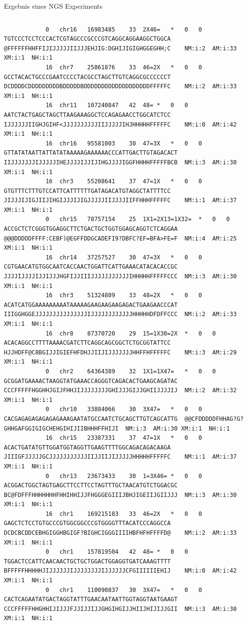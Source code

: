 \documentclass[10pt]{beamer}
\begin{document}
\begin{frame}[fragile]{Ergebnis eines NGS Experiments}
\begin{columns}
\begin{lstlisting}
			0	chr16	16983485	33	2X46=	*	0	0	TGTCCCTCCTCCCACTCGTAGCCCGCCCGTCAGGCAGGAAGGCTGGCA	@FFFFFFHHFFIJIJJJJJIIJJJEHJIG:DGHIJIGIGHGGEGHH;C	NM:i:2	AM:i:33	XM:i:1	NH:i:1
			16	chr7	25861876	33	46=2X	*	0	0	GCCTACACTGCCCGAATCCCCTACGCCTAGCTTGTCAGGCGCCCCCCT	DCDDDDCDDDDDDDDDBDDDDDBDDDDDDDDDDDDDDDDDDDFFFFFC	NM:i:2	AM:i:33	XM:i:1	NH:i:1
			16	chr11	107240847	42	48=	*	0	0	AATCTACTGAGCTAGCTTAAGAAAGGCTCCAGAGAACCTGGCATCTCC	IJJJJJJIIGHJGIHF<JJJJJJJJJJIIJJJJJIHJHHHHHFFFFFC	NM:i:0	AM:i:42	XM:i:1	NH:i:1
			16	chr16	95581003	30	47=3X	*	0	0	GTTATATAATTATTATATAAAAAGAAAAAACCCATTGACTTGTAGACACT	IIJJJJJJJIJJJJJIHEJJJJIJJIJIHGJJJJIGGFHHHHFFFFFBCB	NM:i:3	AM:i:30	XM:i:1	NH:i:1
			16	chr3	55208641	37	47=1X	*	0	0	GTGTTTCTTTGTCCATTCATTTTTTGATAGACATGTAGGCTATTTTCC	JIJJJIJIGJIIJIHGIJJJIJIGJJJJJIIJJJJIIFFHHHFFFFFC	NM:i:1	AM:i:37	XM:i:1	NH:i:1
			0	chr15	78757154	25	1X1=2X13=1X32=	*	0	0	ACCGCTCTCGGGTGGAGGCTTCTGACTGCTGGTGGAGCAGGTCTCAGGAA	@@@DDDDDFFFF:CEBF)@EGFFDDGCADEFI9?DBFC?EF=BFA>FE=F	NM:i:4	AM:i:25	XM:i:1	NH:i:1
			16	chr14	37257527	30	47=3X	*	0	0	CGTGAACATGTGGCAATCACCAACTGGATTCATTGAAACATACACACCGC	JJJJIJJJJIJJIJJJHGFIJJIIIJJJJJJJJJJJIHHHHHFFFFFCCC	NM:i:3	AM:i:30	XM:i:1	NH:i:1
			16	chr3	51324809	33	48=2X	*	0	0	ACATCATGGAAAAAAAAATAAAAAGAAGAAGAAGAGACTGAAGAACCCAT	IIIGGHGGEJJJJJJJJJJJJJJJIJJJJJJJJJJJJHHHHHDFDFFCCC	NM:i:2	AM:i:33	XM:i:1	NH:i:1
			16	chr8	87370720	29	15=1X30=2X	*	0	0	ACACAGGCCTTTTAAAACGATCTTCAGGCAGCGGCTCTGCGGTATTCC	HJJHDFF@C8BGIJJIGIEFHFDHJJIIJIJJJJJJJHHFFHFFFFFC	NM:i:3	AM:i:29	XM:i:1	NH:i:1
			0	chr2	64364389	32	1X1=1X47=	*	0	0	GCGGATGAAAACTAAGGTATGAAACCAGGGTCAGACACTGAAGCAGATAC	CCCFFFFFHGGHHJGIJFHHJIJJJJJJJJGHIJJJGIJJGHIIJJJJIJ	NM:i:2	AM:i:32	XM:i:1	NH:i:1
			0	chr10	33884066	30	3X47=	*	0	0	CACGAGAGAGAGAGAGAAAGAATATGCCAATCTGCAGCTTGTCAGCATTG	@@CFDDDDDFHHAG?G?GHHGAFGGIGIGCHEHGIHIJIIBHHHFFHIJI	NM:i:3	AM:i:30	XM:i:1	NH:i:1
			16	chr15	23387331	37	47=1X	*	0	0	ACACTGATATGTTGGATGGTAGGTTGAAGTTTTGGCAGACAGACAAGA	JIIIGFJJJJJGCJJJJJJJJJJJIIJJIIJIJJJJJHHHHHFFFFFC	NM:i:1	AM:i:37	XM:i:1	NH:i:1
			0	chr13	23673433	30	1=3X46=	*	0	0	ACGGACTGGCTAGTGAGCTTCCTTCCTAGTTTGCTAACATGTCTGGACGC	BC@FDFFFHHHHHHHFHHIHHIJJFHGGGEGIIIJBHJIGEIIJGIIJJJ	NM:i:3	AM:i:30	XM:i:1	NH:i:1
			16	chr1	169215183	33	46=2X	*	0	0	GAGCTCTCCTGTGCCCGTGGCGGCCCGTGGGGTTTACATCCCAGGCCA	DCDCBCDDCEBHGIGGHBGIGF?BIGHCIGGGIIIIHBFHFHFFFFD@	NM:i:2	AM:i:33	XM:i:1	NH:i:1
			0	chr1	157819504	42	48=	*	0	0	TGGACTCCATTCAACAACTGCTGCTGGACTGGAGGTGATCAAAGTTTT	BFFFFFHHHHHJIJJJJJJIJJJJJJJJIJJJJJJCFGIIIIIIEHIJ	NM:i:0	AM:i:42	XM:i:1	NH:i:1
			0	chr1	110090837	30	3X47=	*	0	0	CACTCAGAATATGACTAGGTATTTGAACAATAATTGGTAGGTAATGAAGT	CCCFFFFFHHGHHIJIJJJFJJIJJIJJGHGIHGIJJHIIJHIJIJJGII	NM:i:3	AM:i:30	XM:i:1	NH:i:1

\end{lstlisting}
\end{columns}
\end{frame}
\end{document}
